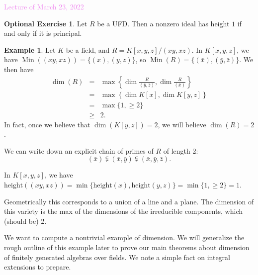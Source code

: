 \documentclass{amsart}[12pt]
\def\htt{\mathrm{height}}
\def\Min{\operatorname{Min}}
\newcommand{\Mar}[1]{\textcolor{violet}{Lecture of March #1, 2022}}
\newcommand{\q}{{\mathfrak q}}
\numberwithin{equation}{section}
\theoremstyle{plain} %
\newtheorem{lem}[equation]{Lemma}
\theoremstyle{definition}
\newtheorem{ex}[equation]{Example}
\newtheorem{exer}[equation]{Optional Exercise}
\theoremstyle{remark}
\begin{document}
\Mar{23}

\begin{exer} Let $R$ be a UFD. Then a nonzero ideal has height $1$ if and only if it is principal.
\end{exer}


\begin{ex} Let $K$ be a field, and $R=K[x,y,z]/(xy,xz)$. In $K[x,y,z]$, we have $\Min((xy,xz))=\{(x),(y,z)\}$, so $\Min(R)=\{ (\bar{x}), (\bar{y},\bar{z})\}$. We then have 
\begin{eqnarray*}
\dim(R) &=& \max\left\{\dim \frac{R}{(\bar y,\bar z)}, \dim \frac{R}{(\bar x)}\right \}\\
&=& \max\left\{\dim K[x], \dim K[y,z] \right \}\\
&=&\max\{ 1 ,\geq 2\}\\
&\geq&2.
\end{eqnarray*}
In fact, once we believe that $\dim(K[y,z])=2$, we will believe $\dim(R)=2$.

We can write down an explicit chain of primes of $R$ of length 2: 
\[(\bar x)\subsetneqq (\bar x, \bar y)\subsetneqq (\bar x, \bar y, \bar z).\] 

In $K[x,y,z]$, we have $\htt((xy,xz)) = \min\{ \htt(x), \htt(y,z) \} = \min\{ 1, \geq 2\} = 1$.

Geometrically this corresponds to a union of a line and a plane. The dimension of this variety is the max of the dimensions of the irreducible components, which (should be) 2.
\end{ex}

We want to compute a nontrivial example of dimension. We will generalize the rough outline of this example later to prove our main theorems about dimension of finitely generated algebras over fields. We note a simple fact on integral extensions to prepare.
\end{document}
